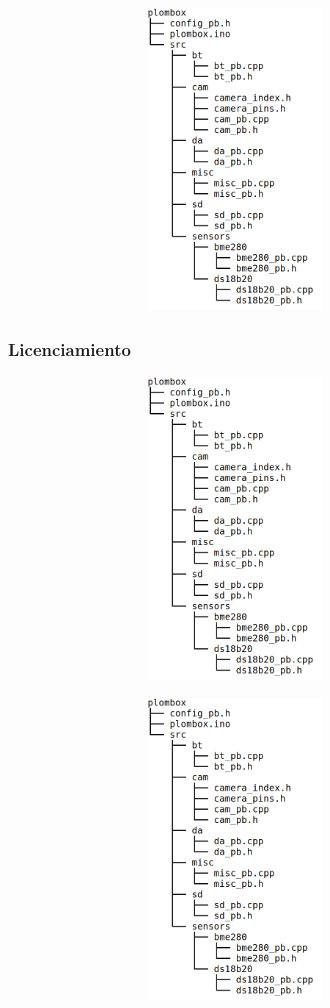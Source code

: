 \documentclass[a4paper,11pt]{article}
\begin{document}
    \begin{center}
			\includegraphics[height=8cm,width=12cm]{tree_dir}
    \end{center}

\subsubsection{Licenciamiento}

    \begin{center}
			\includegraphics[height=8cm,width=12cm]{tree_dir}
    \end{center}

    \begin{center}
			\includegraphics[height=8cm,width=12cm]{tree_dir}
    \end{center}
\end{document}
